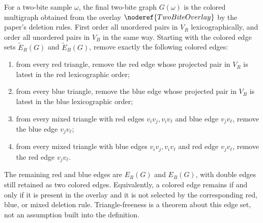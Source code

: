 \begin{definition}
For a two-bite sample \(\omega\), the final two-bite graph \(G(\omega)\) is the
colored multigraph obtained from the overlay \(\noderef{TwoBiteOverlay}\) by the
paper's deletion rules.  First order all unordered pairs in \(V_R\)
lexicographically, and order all unordered pairs in \(V_B\) in the same way.
Starting with the colored edge sets
\(\widetilde E_R(G)\) and \(\widetilde E_B(G)\), remove exactly the following
colored edges:
\begin{enumerate}
\item from every red triangle, remove the red edge whose projected pair in
\(V_R\) is latest in the red lexicographic order;
\item from every blue triangle, remove the blue edge whose projected pair in
\(V_B\) is latest in the blue lexicographic order;
\item from every mixed triangle with red edges \(v_iv_j,v_iv_\ell\) and blue
edge \(v_jv_\ell\), remove the blue edge \(v_jv_\ell\);
\item from every mixed triangle with blue edges \(v_iv_j,v_iv_\ell\) and red
edge \(v_jv_\ell\), remove the red edge \(v_jv_\ell\).
\end{enumerate}
The remaining red and blue edges are \(E_R(G)\) and \(E_B(G)\), with double
edges still retained as two colored edges.  Equivalently, a colored edge remains
if and only if it is present in the overlay and it is not selected by the
corresponding red, blue, or mixed deletion rule.  Triangle-freeness is a theorem
about this edge set, not an assumption built into the definition.
\end{definition}
